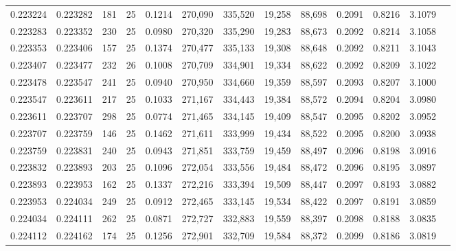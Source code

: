 \begin{tabular}{rrrrrrrrrrrrr}
0.223224 & 0.223282 &   181 &  25 &                                     0.1214 & 270,090 & 335,520 &  19,258 &  88,698 & 0.2091 & 0.8216 & 3.1079 \\
0.223283 & 0.223352 &   230 &  25 &                                     0.0980 & 270,320 & 335,290 &  19,283 &  88,673 & 0.2092 & 0.8214 & 3.1058 \\
0.223353 & 0.223406 &   157 &  25 &                                     0.1374 & 270,477 & 335,133 &  19,308 &  88,648 & 0.2092 & 0.8211 & 3.1043 \\
0.223407 & 0.223477 &   232 &  26 &                                     0.1008 & 270,709 & 334,901 &  19,334 &  88,622 & 0.2092 & 0.8209 & 3.1022 \\
0.223478 & 0.223547 &   241 &  25 &                                     0.0940 & 270,950 & 334,660 &  19,359 &  88,597 & 0.2093 & 0.8207 & 3.1000 \\
0.223547 & 0.223611 &   217 &  25 &                                     0.1033 & 271,167 & 334,443 &  19,384 &  88,572 & 0.2094 & 0.8204 & 3.0980 \\
0.223611 & 0.223707 &   298 &  25 &                                     0.0774 & 271,465 & 334,145 &  19,409 &  88,547 & 0.2095 & 0.8202 & 3.0952 \\
0.223707 & 0.223759 &   146 &  25 &                                     0.1462 & 271,611 & 333,999 &  19,434 &  88,522 & 0.2095 & 0.8200 & 3.0938 \\
0.223759 & 0.223831 &   240 &  25 &                                     0.0943 & 271,851 & 333,759 &  19,459 &  88,497 & 0.2096 & 0.8198 & 3.0916 \\
0.223832 & 0.223893 &   203 &  25 &                                     0.1096 & 272,054 & 333,556 &  19,484 &  88,472 & 0.2096 & 0.8195 & 3.0897 \\
0.223893 & 0.223953 &   162 &  25 &                                     0.1337 & 272,216 & 333,394 &  19,509 &  88,447 & 0.2097 & 0.8193 & 3.0882 \\
0.223953 & 0.224034 &   249 &  25 &                                     0.0912 & 272,465 & 333,145 &  19,534 &  88,422 & 0.2097 & 0.8191 & 3.0859 \\
0.224034 & 0.224111 &   262 &  25 &                                     0.0871 & 272,727 & 332,883 &  19,559 &  88,397 & 0.2098 & 0.8188 & 3.0835 \\
0.224112 & 0.224162 &   174 &  25 &                                     0.1256 & 272,901 & 332,709 &  19,584 &  88,372 & 0.2099 & 0.8186 & 3.0819 \\

\end{tabular}
